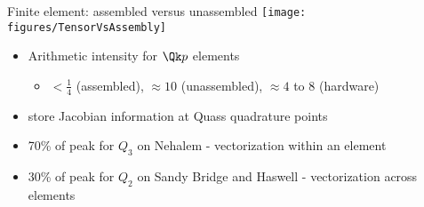 \documentclass{beamer}
\begin{document}
\begin{frame}{Finite element: assembled versus unassembled}
  \vspace{1ex}
  \texttt{[image: figures/TensorVsAssembly]} \\
  \begin{itemize}
  \item Arithmetic intensity for $\Qk p$ elements
    \begin{itemize}
    \item $< \frac 1 4$ (assembled), $\approx 10$ (unassembled), $\approx 4$ to $8$ (hardware)
    \end{itemize}
  \item store Jacobian information at Quass quadrature points
  \item 70\% of peak for $Q_3$ on Nehalem - vectorization within an element
  \item 30\% of peak for $Q_2$ on Sandy Bridge and Haswell - vectorization across elements
  \end{itemize}
\end{frame}
\end{document}
